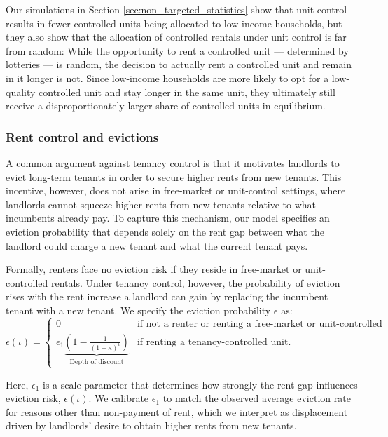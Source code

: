 \documentclass[parskip=full]{article}
\begin{document}
Our simulations in Section \ref{sec:non_targeted_statistics} show that unit control results in fewer controlled units being allocated to low-income households, but they also show that the allocation of controlled rentals under unit control is far from random: While the opportunity to rent a controlled unit — determined by lotteries — is random, the decision to actually rent a controlled unit and remain in it longer is not. Since low-income households are more likely to opt for a low-quality controlled unit and stay longer in the same unit, they ultimately still receive a disproportionately larger share of controlled units in equilibrium.

\subsubsection{Rent control and evictions}\label{sec:eviction}

A common argument against tenancy control is that it motivates landlords to evict long-term tenants in order to secure higher rents from new tenants. This incentive, however, does not arise in free-market or unit-control settings, where landlords cannot squeeze higher rents from new tenants relative to what incumbents already pay. To capture this mechanism, our model specifies an eviction probability that depends solely on the rent gap between what the landlord could charge a new tenant and what the current tenant pays.

Formally, renters face no eviction risk if they reside in free-market or unit-controlled rentals. Under tenancy control, however, the probability of eviction rises with the rent increase a landlord can gain by replacing the incumbent tenant with a new tenant. We specify the eviction probability $\epsilon$ as:
\begin{equation}\label{eq:eviction}
\epsilon(\iota)=
\begin{cases}
0 & \text{if not a renter or renting a free-market or unit-controlled unit} \\ \epsilon_1 \underbrace{\left(1-\frac{1}{\left(1 + \kappa \right)^{\iota}}\right)}_{\text{Depth of discount}} & \text{if renting a tenancy-controlled unit}.
\end{cases}
\end{equation}

\noindent Here, $\epsilon_1$ is a scale parameter that determines how strongly the rent gap influences eviction risk, $\epsilon(\iota)$. We calibrate $\epsilon_1$ to match the observed average eviction rate for reasons other than non-payment of rent, which we interpret as displacement driven by landlords' desire to obtain higher rents from new tenants.
\end{document}
